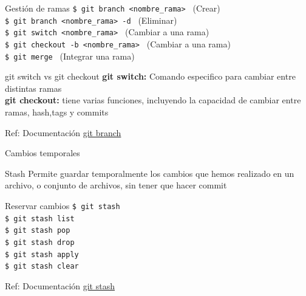 \documentclass{beamer}
\begin{document}
  \begin{frame}
    
    \begin{block}{ Gestión de ramas }
      {\texttt{\$ git branch <nombre\_rama> }}  (Crear)\\
      {\texttt{\$ git branch <nombre\_rama> -d }} (Eliminar) \\
      {\texttt{\$ git switch <nombre\_rama> }} (Cambiar a una rama) \\
      {\texttt{\$ git checkout -b <nombre\_rama> }} (Cambiar a una rama) \\
      {\texttt{\$ git merge }} (Integrar una rama) \\
    \end{block}

    \begin{exampleblock}{git switch vs git checkout }
      \textbf{git switch:} Comando especifico para cambiar entre distintas ramas \\
      \textbf{git checkout:} tiene varias funciones, incluyendo la capacidad de cambiar entre ramas, hash,tags y commits
    \end{exampleblock}

    Ref: Documentación \href{https://docs.github.com/es/pull-requests/collaborating-with-pull-requests/proposing-changes-to-your-work-with-pull-requests/creating-and-deleting-branches-within-your-repository}{git branch} 
  
  \end{frame}

  \begin{frame}{Cambios temporales}
    
    \begin{exampleblock}{Stash}
      Permite guardar temporalmente los cambios que hemos realizado en un archivo, o conjunto de archivos, sin tener que hacer commit
    \end{exampleblock}

    \begin{block}{Reservar cambios}
      {\texttt{\$ git stash}} \\
      {\texttt{\$ git stash list}} \\
      {\texttt{\$ git stash pop}} \\
      {\texttt{\$ git stash drop}} \\
      {\texttt{\$ git stash apply}} \\
      {\texttt{\$ git stash clear}} 
    \end{block}

    Ref: Documentación \href{https://git-scm.com/docs/git-stash}{git stash}
  \end{frame}
  
\end{document}

